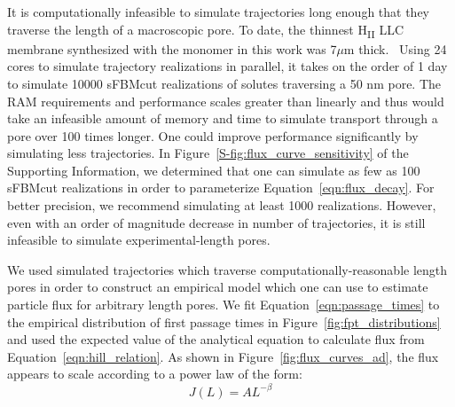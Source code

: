 \documentclass[journal=jctcce,manuscript=article]{achemso}
\begin{document}
  It is computationally infeasible to simulate trajectories long enough that
  they traverse the length of a macroscopic pore. To date, the thinnest
  H\textsubscript{II} LLC membrane synthesized with the monomer in this work
  was 7$\mu$m thick.~\cite{feng_thin_2016}
  Using 24 cores to simulate trajectory realizations in
  parallel, it takes on the order of 1 day to simulate 10000 sFBMcut
  realizations of solutes traversing a 50 nm pore. The RAM requirements and
  performance scales greater than linearly and thus would take an infeasible
  amount of memory and time to simulate transport through a pore over 100 times
  longer. One could improve performance significantly by simulating less
  trajectories. In Figure~\ref{S-fig:flux_curve_sensitivity} of the Supporting
  Information, we determined that one can simulate as few as 100 sFBMcut
  realizations in order to parameterize Equation~\ref{eqn:flux_decay}. For
  better precision, we recommend simulating at least 1000 realizations.
  However, even with an order of magnitude decrease in number of trajectories,
  it is still infeasible to simulate experimental-length pores.
  
  We used simulated trajectories which traverse computationally-reasonable
  length pores in order to construct an empirical model which one can use to
  estimate particle flux for arbitrary length pores. We fit
  Equation~\ref{eqn:passage_times} to the empirical distribution of first
  passage times in Figure~\ref{fig:fpt_distributions} and used the expected
  value of the analytical equation to calculate flux from
  Equation~\ref{eqn:hill_relation}. As shown in
  Figure~\ref{fig:flux_curves_ad}, the flux appears to scale according to a
  power law of the form:
  \begin{equation}
  J(L) = AL^{-\beta} 
  \label{eqn:flux_decay}
  \end{equation}
\end{document}
